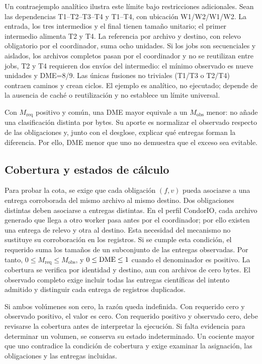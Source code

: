 Un contraejemplo analítico ilustra este límite bajo restricciones adicionales. Sean las dependencias T1--T2--T3--T4 y T1--T4, con ubicación W1/W2/W1/W2. La entrada, los tres intermedios y el final tienen tamaño unitario; el primer intermedio alimenta T2 y T4. La referencia por archivo y destino, con relevo obligatorio por el coordinador, suma ocho unidades. Si los jobs son secuenciales y aislados, los archivos completos pasan por el coordinador y no se reutilizan entre jobs, T2 y T4 requieren dos envíos del intermedio: el mínimo observado es nueve unidades y DME=8/9. Las únicas fusiones no triviales (T1/T3 o T2/T4) contraen caminos y crean ciclos. El ejemplo es analítico, no ejecutado; depende de la ausencia de caché o reutilización y no establece un límite universal.

Con $M_{\mathrm{req}}$ positivo y común, una DME mayor equivale a un $M_{\mathrm{obs}}$ menor: no añade una clasificación distinta por bytes. Su aporte es normalizar el observado respecto de las obligaciones y, junto con el desglose, explicar qué entregas forman la diferencia. Por ello, DME menor que uno no demuestra que el exceso sea evitable.

\subsection{Cobertura y estados de cálculo}
Para probar la cota, se exige que cada obligación $(f,v)$ pueda asociarse a una entrega corroborada del mismo archivo al mismo destino. Dos obligaciones distintas deben asociarse a entregas distintas. En el perfil CondorIO, cada archivo generado que llega a otro worker pasa antes por el coordinador; por ello existen una entrega de relevo y otra al destino. Esta necesidad del mecanismo no sustituye su corroboración en los registros. Si se cumple esta condición, el requerido suma los tamaños de un subconjunto de las entregas observadas. Por tanto, $0\leq M_{\mathrm{req}}\leq M_{\mathrm{obs}}$, y $0\leq\mathrm{DME}\leq 1$ cuando el denominador es positivo. La cobertura se verifica por identidad y destino, aun con archivos de cero bytes. El observado completo exige incluir todas las entregas científicas del intento admitido y distinguir cada entrega de registros duplicados.

Si ambos volúmenes son cero, la razón queda indefinida. Con requerido cero y observado positivo, el valor es cero. Con requerido positivo y observado cero, debe revisarse la cobertura antes de interpretar la ejecución. Si falta evidencia para determinar un volumen, se conserva su estado indeterminado. Un cociente mayor que uno contradice la condición de cobertura y exige examinar la asignación, las obligaciones y las entregas incluidas.

